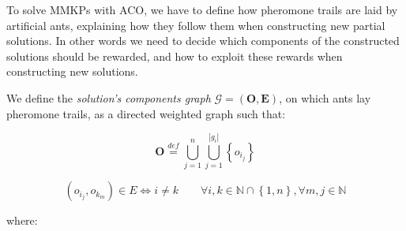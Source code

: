 \documentclass[12pt,a4paper]{report}
\newcommand{\mathDef}{\overset{\textit{def}}{=}}
\newcommand{\N}{\mathbb{N}}
\theoremstyle{definition}
\begin{document}
To solve MMKPs with ACO, we have to define how pheromone trails are laid by artificial ants, explaining how they follow them when constructing new partial solutions. In other words we need to decide which components of the constructed solutions should be rewarded, and how to exploit these rewards when constructing new solutions.

We define the \textit{solution's components graph} $\mathcal{G}=(\textbf{O},\textbf{E})$, on which ants lay pheromone trails, as a directed weighted graph such that:

\begin{equation}
	\textbf{O} \mathDef \bigcup_{j=1}^n \bigcup_{j=1}^{|g_i|} \left\{ o_{i_j} \right\}
\end{equation}

\begin{equation}
	(o_{i_j}, o_{k_m}) \in E \Leftrightarrow i \neq k \qquad \forall i,k \in \N \cap \left\{1,n\right\}, \forall m,j \in \N
\end{equation}

where: 
\end{document}
